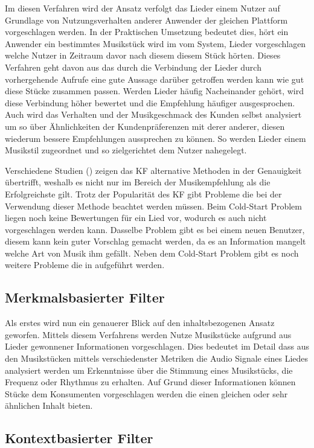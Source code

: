 \documentclass[twosided,a4,10pt]{article}
\begin{document}
\begin{multicols}{2}
		 Im diesen Verfahren wird der Ansatz verfolgt das Lieder einem Nutzer auf Grundlage von Nutzungsverhalten anderer Anwender der gleichen Plattform vorgeschlagen werden. In der Praktischen Umsetzung bedeutet dies, hört ein Anwender ein bestimmtes Musikstück wird im vom System, Lieder vorgeschlagen welche Nutzer in Zeitraum davor nach diesem diesem Stück hörten. Dieses Verfahren geht davon aus das durch die Verbindung der Lieder durch vorhergehende Aufrufe eine gute Aussage darüber getroffen werden kann wie gut diese Stücke zusammen passen. Werden Lieder häufig Nacheinander gehört, wird diese Verbindung höher bewertet und die Empfehlung häufiger ausgesprochen. Auch wird das Verhalten und der Musikgeschmack des Kunden selbst analysiert um so über Ähnlichkeiten der Kundenpräferenzen mit derer anderer, diesen wiederum bessere Empfehlungen aussprechen zu können. So werden Lieder einem Musikstil zugeordnet und so zielgerichtet dem Nutzer nahegelegt.

		Verschiedene Studien (\cite{mcfee}\cite{barrington}) zeigen das KF alternative Methoden in der Genauigkeit übertrifft, weshalb es nicht nur im Bereich der Musikempfehlung als die Erfolgreichste gilt.\newline
		Trotz der Popularität des KF gibt Probleme die bei der Verwendung dieser Methode beachtet werden müssen. Beim Cold-Start Problem liegen noch keine Bewertungen für ein Lied vor, wodurch es auch nicht vorgeschlagen werden kann. Dasselbe Problem gibt es bei einem neuen Benutzer, diesem kann kein guter Vorschlag gemacht werden, da es an Information mangelt welche Art von Musik ihm gefällt. \cite{celma} Neben dem Cold-Start Problem gibt es noch weitere Probleme die in \cite{celma} aufgeführt werden.
		

		
		\subsection{Merkmalsbasierter Filter}
		Als erstes wird nun ein genauerer Blick auf den inhaltsbezogenen Ansatz geworfen. Mittels diesem Verfahrens werden Nutze Musikstücke aufgrund aus Lieder gewonnener Informationen vorgeschlagen. Dies bedeutet im Detail dass aus den Musikstücken mittels verschiedenster Metriken die Audio Signale eines Liedes analysiert werden um Erkenntnisse über die Stimmung eines Musikstücks, die Frequenz oder Rhythmus zu erhalten. Auf Grund dieser Informationen können Stücke dem Konsumenten vorgeschlagen werden die einen gleichen oder sehr ähnlichen Inhalt bieten.
		\subsection{Kontextbasierter Filter}


\end{multicols}
\end{document}

